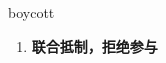 
\begin{frame}
{\huge boycott}
\begin{center}
\begin{enumerate}\Large
  \item \textbf{联合抵制，拒绝参与}
\end{enumerate}
\end{center}
\end{frame}
